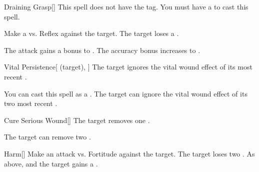 \lowercase{\hypertarget{spell:Draining Grasp}{}}\label{spell:Draining Grasp}
\begin{freeability}[Rank 3]{\hypertarget{spell:Draining Grasp}{Draining Grasp}}[]
This spell does not have the  tag.
You must have a  to cast this spell.

Make a  vs. Reflex against the target.
\hit The target loses a .

\rankline
{} The attack gains a  bonus to .
 The accuracy bonus increases to .
\end{freeability}
\vspace{0.25em}



\lowercase{\hypertarget{spell:Vital Persistence}{}}\label{spell:Vital Persistence}
\begin{attuneability}[Rank 3]{\hypertarget{spell:Vital Persistence}{Vital Persistence}}[ (target), ]
The target ignores the vital wound effect of its most recent .

\rankline
{} You can cast this spell as a .
 The target can ignore the vital wound effect of its two most recent .
\end{attuneability}
\vspace{0.25em}



\lowercase{\hypertarget{spell:Cure Serious Wound}{}}\label{spell:Cure Serious Wound}
\begin{apability}[Rank 5]{\hypertarget{spell:Cure Serious Wound}{Cure Serious Wound}}[]
The target removes one .

\rankline
{} The target can remove two .
\end{apability}
\vspace{0.25em}



\lowercase{\hypertarget{spell:Harm}{}}\label{spell:Harm}
\begin{freeability}[Rank 7]{\hypertarget{spell:Harm}{Harm}}[]
Make an attack vs. Fortitude against the target.
\hit The target loses two .
\crit As above, and the target gains a .
\end{freeability}
\vspace{0.25em}



